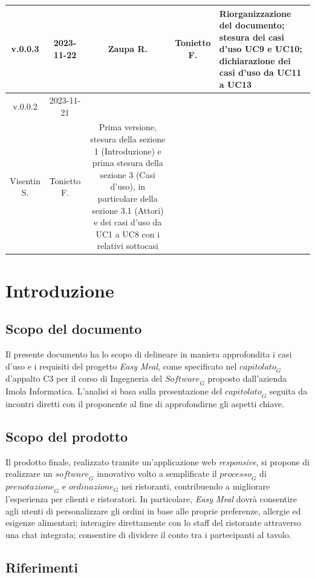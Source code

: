 \documentclass[12pt, oneside]{article}
\begin{document}
\begin{longtable}{|c|c|c|c|p{7cm}|}
\hline
v.0.0.3 & 2023-11-22 & Zaupa R. & Tonietto F. & Riorganizzazione del documento; stesura dei casi d'uso UC9 e UC10; dichiarazione dei casi d'uso da UC11 a UC13 \\
\hline
v.0.0.2 & 2023-11-21 & 
  \begin{tabular}[c]{@{}c@{}}
    Zaupa R. \\
    Visentin S.
  \end{tabular} 
  & Tonietto F. & Prima versione, stesura della sezione 1 (Introduzione) e prima stesura della sezione 3 (Casi d'uso), in particolare della sezione 3.1 (Attori) e dei casi d'uso da UC1 a UC8 con i relativi sottocasi\\
\hline
\end{longtable}
\newpage

\tableofcontents
\newpage

\section{Introduzione}
\subsection{Scopo del documento}
Il presente documento ha lo scopo di delineare in maniera approfondita i casi d'uso e i requisiti del progetto \textit{Easy Meal}, come specificato nel $\textit{capitolato}_G$ d'appalto C3 per il corso di Ingegneria del $\textit{Software}_G$ proposto dall'azienda Imola Informatica.
L'analisi si basa sulla presentazione del $\textit{capitolato}_G$ seguita da incontri diretti con il proponente al fine di approfondirne gli aspetti chiave.
\subsection{Scopo del prodotto}
Il prodotto finale, realizzato tramite un'applicazione web \emph{responsive}, si propone di realizzare un $\textit{software}_G$ innovativo volto a semplificate il $\textit{processo}_G$ di $\textit{prenotazione}_G$ e $\textit{ordinazione}_G$ nei ristoranti, contribuendo a migliorare l'esperienza per clienti e ristoratori. In particolare, \textit{Easy Meal} dovrà consentire agli utenti di personalizzare gli ordini in base alle proprie preferenze, allergie ed esigenze alimentari; interagire direttamente con lo staff del ristorante attraverso una chat integrata; consentire di dividere il conto tra i partecipanti al tavolo.
\subsection{Riferimenti}
\end{document}
